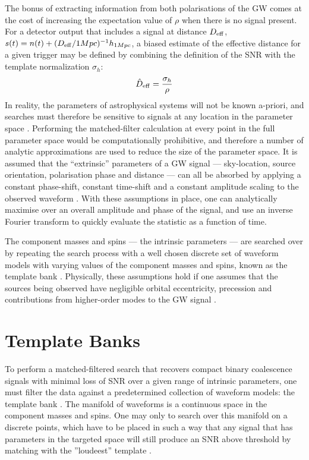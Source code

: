 \documentclass[binding=0.6cm, LaM]{sapthesis}
\begin{document}
	The bonus of extracting information from both polarisations of the GW 
	comes at the cost of increasing the expectation value of $\rho$ when there is no signal present. 
	For a detector output that includes a signal at distance $D_{\rm eff}$, 
	$s(t) = n(t) + (D_{\rm eff}/1 Mpc)^{-1}h_{1Mpc}$, 
	a biased estimate of the effective distance for a given trigger 
	may be defined by combining the definition of the SNR with the template normalization $\sigma_h$:
        \begin{equation}
          \hat D_{\rm eff} = {{\sigma_h} \over {\rho}}
        \end{equation}
	In reality, the parameters of astrophysical systems will not be known a-priori, 
	and searches must therefore be sensitive to signals at any location in the parameter space \cite{25}. 
	Performing the matched-filter calculation at every point in the full parameter space 
	would be computationally prohibitive, 
	and therefore a number of analytic approximations are used to reduce the size of the parameter space. 
	It is assumed that the ``extrinsic'' parameters of a GW signal --- 
	sky-location, source orientation, polarisation phase and distance --- 
	can all be absorbed by applying a constant phase-shift, 
	constant time-shift and a constant amplitude scaling to the observed waveform \cite{27}. 
	With these assumptions in place, 
	one can analytically maximise over an overall amplitude and phase of the signal, 
	and use an inverse Fourier transform to quickly evaluate the statistic as a function of time.

	The component masses and spins --- the intrinsic parameters --- 
	are searched over by repeating the search process with a well chosen discrete set of waveform models 
	with varying values of the component masses and spins, 
	known as the template bank \cite{27}. 
	Physically, these assumptions hold if one assumes that the sources being observed 
	have negligible orbital eccentricity, precession and contributions from higher-order modes 
	to the GW signal \cite{23}. 

\section{Template Banks}
\label{sec:template_banks}
	To perform a matched-filtered search that recovers compact binary coalescence signals
	with minimal loss of SNR over a given range of intrinsic parameters, 
	one must filter the data against a predetermined collection of waveform models: the template bank \cite{28}.
	The manifold of waveforms is a continuous space in the component masses and spins. 
	One may only to search over this manifold on a discrete points, 
	which have to be placed in such a way that any signal
	that has parameters in the targeted space will still produce an SNR 
	above threshold by matching with the ''loudeest'' template \cite{27}.
\end{document}
